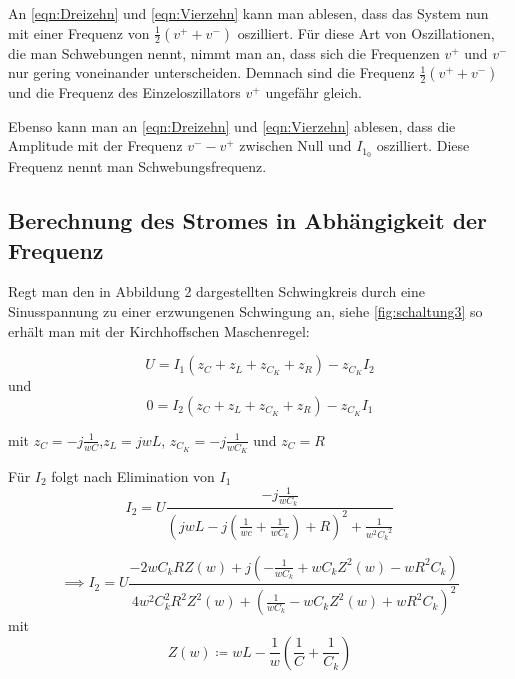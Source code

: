 An \ref {eqn:Dreizehn} und \ref {eqn:Vierzehn} kann man ablesen, dass das System nun mit einer Frequenz von $ \frac{1}{2} (v^{+} + v^{-}) $ oszilliert. Für diese Art von Oszillationen, die man Schwebungen nennt,
nimmt man an, dass sich die Frequenzen $ v^{+} $ und $ v^{-} $ nur gering voneinander unterscheiden. Demnach sind die Frequenz $ \frac{1}{2} (v^{+} + v^{-}) $ und
die Frequenz des Einzeloszillators $ v^{+} $ ungefähr gleich.

Ebenso kann man an \ref {eqn:Dreizehn} und \ref {eqn:Vierzehn} ablesen, dass die Amplitude mit der Frequenz $ v^{-} - v^{+} $ zwischen Null und $ I_{1_0} $ oszilliert. Diese Frequenz nennt man Schwebungsfrequenz.

\subsection{Berechnung des Stromes in Abhängigkeit der Frequenz}
Regt man den in Abbildung 2 dargestellten Schwingkreis durch eine Sinusspannung zu einer erzwungenen Schwingung an, siehe \autoref{fig:schaltung3}   
so erhält man mit der Kirchhoffschen Maschenregel:






\begin{equation}
    U = I_1 (z_C + z_L + z_{C_K} + z_R) - z_{C_K} I_2
    \label{eqn:Fuenfzehn}
\end{equation}
und
\begin{equation}
    0 = I_2 (z_C + z_L + z_{C_K} + z_R) - z_{C_K} I_1
    \label{eqn:Sechzehn}
\end{equation}

mit $z_C = -j \frac{1}{wC}$,$z_L = jwL$, $z_{C_K} = -j \frac{1}{wC_K}$  und  $z_C = R$



Für $I_2$ folgt nach Elimination von $I_1$
\begin{equation}
    I_2 = U \frac{-j\frac{1}{wC_k}}{(jwL - j(\frac{1}{wc} + \frac{1}{wC_k})+R)^2 + \frac{1}{w^2 {C_k}^2}}
    \label{eqn:Siebzehn}
\end{equation}

\begin{equation}
    \implies I_2 = U \frac{ -2wC_kRZ(w) + j(- \frac{1}{wC_k} + wC_kZ^2(w) - wR^2C_k) }{ 4w^2C_k^2R^2Z^2(w) + ( \frac{1}{wC_k} - wC_kZ^2(w) + wR^2C_k )^2 }
    \label{eqn:Achtzehn}
\end{equation} 
mit
\begin{equation}
    Z(w) \coloneq wL - \frac{1}{w} (\frac{1}{C} + \frac{1}{C_k})
    \label{eqn:Neunzehn}
\end{equation}

